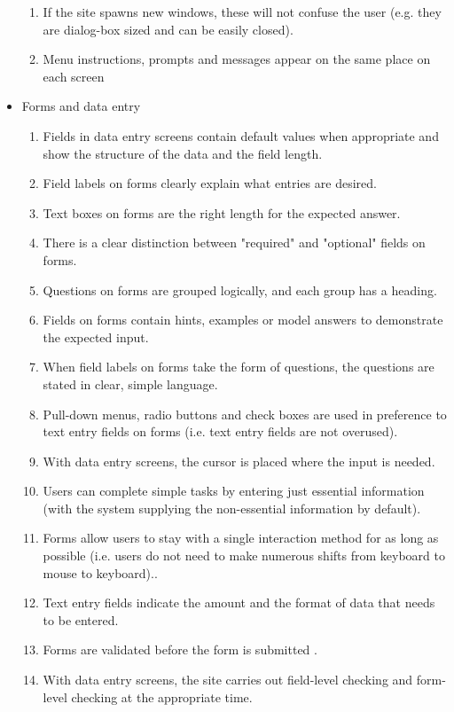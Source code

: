 \begin{itemize}
\begin{enumerate}
        \item If the site spawns new windows, these will not confuse the user (e.g. they are dialog-box sized and can be easily closed).
        \item Menu instructions, prompts and messages appear on the same place on each screen
      \end{enumerate}
  \item Forms and data entry
      \begin{enumerate}
        \item Fields in data entry screens contain default values when appropriate and show the structure of the data and the field length.
        \item Field labels on forms clearly explain what entries are desired.
        \item Text boxes on forms are the right length for the expected answer.
        \item There is a clear distinction between "required" and "optional" fields on forms.
        \item Questions on forms are grouped logically, and each group has a heading.
        \item Fields on forms contain hints, examples or model answers to demonstrate the expected input.
        \item When field labels on forms take the form of questions, the questions are stated in clear, simple language.
        \item Pull-down menus, radio buttons and check boxes are used in preference to text entry fields on forms (i.e. text entry fields are not overused).
        \item With data entry screens, the cursor is placed where the input is needed.
        \item Users can complete simple tasks by entering just essential information (with the system supplying the non-essential information by default).
        \item Forms allow users to stay with a single interaction method for as long as possible (i.e. users do not need to make numerous shifts from keyboard to mouse to keyboard)..
        \item Text entry fields indicate the amount and the format of data that needs to be entered.
        \item Forms are validated before the form is submitted .
        \item With data entry screens, the site carries out field-level checking and form-level checking at the appropriate time.

\end{enumerate}
\end{itemize}
